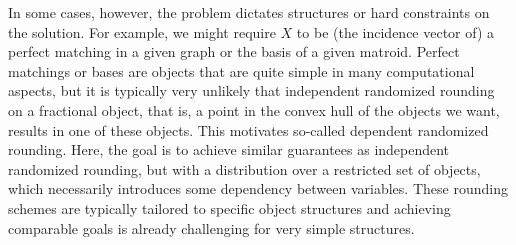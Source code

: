 \documentclass[a4paper,USenglish,cleveref,thm-restate]{lipics-v2021}
\begin{document}
In some cases, however, the problem dictates structures or
hard constraints on the solution. For example, we might
require $X$ to be (the incidence vector of) a perfect matching
in a given graph or the basis of a given matroid.
Perfect matchings or bases are objects
that are quite simple in many computational aspects,
but it is typically very unlikely that independent
randomized rounding on a fractional object,
that is, a point in the convex hull of the objects we
want, results in one of these objects.
This motivates so-called dependent randomized rounding.
Here, the goal is to achieve similar guarantees
as independent randomized rounding, but with a distribution over a restricted set of objects,
which necessarily introduces some dependency between
variables.
These rounding schemes are typically tailored to specific
object structures and achieving comparable goals is already challenging for very simple structures.
\end{document}
